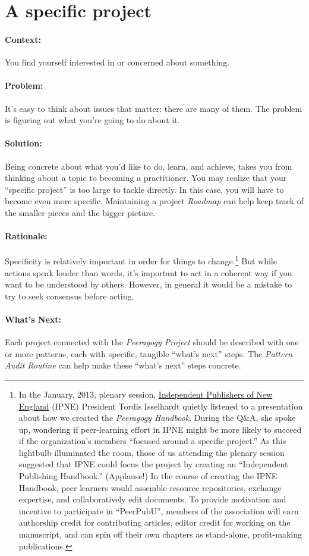 \section{A specific project}
\paragraph{Context:}
You find yourself interested in or concerned about something.

\paragraph{Problem:}
It's easy to think about issues that matter: there are many of them. The problem is figuring out what you're going to do about it.

\paragraph{Solution:} 
Being concrete about what you'd like to do, learn, and achieve, takes you from thinking about a topic to becoming a practitioner.  You may realize that your ``specific project'' is too large to tackle directly. In this case, you will have to become even more specific.  Maintaining a project \emph{Roadmap} can help keep track of the smaller pieces and the bigger picture.

\paragraph{Rationale:} 
Specificity is relatively important in order for things to change.\footnote{In the January, 2013, plenary
session, \href{http://ipne.org}{Independent Publishers of New England}
(IPNE) President Tordis Isselhardt quietly listened to a presentation
about how we created the \emph{Peeragogy Handbook}. During the Q\&A, she
spoke up, wondering if peer-learning effort in IPNE might be more likely
to succeed if the organization's members ``focused around a specific
project.'' As this lightbulb illuminated the room, those of us attending
the plenary session suggested that IPNE could focus the project by
creating an ``Independent Publishing Handbook.'' (Applause!) In the
course of creating the IPNE Handbook, peer learners would assemble
resource repositories, exchange expertise, and collaboratively edit
documents. To provide motivation and incentive to participate in
``PeerPubU'', members of the association will earn authorship credit for
contributing articles, editor credit for working on the manuscript, and
can spin off their own chapters as stand-alone, profit-making
publications.} But while actions speak louder than words, it's important
to act in a coherent way if you want to be understood by others.  However, in
general it would be a mistake to try to seek consensus before acting.

\paragraph{What's Next:}  Each project connected with the \emph{Peeragogy Project} should be described with one or more patterns, each with specific, tangible ``what's next'' steps.  The \emph{Pattern Audit Routine} can help make these ``what's next'' steps concrete. 
